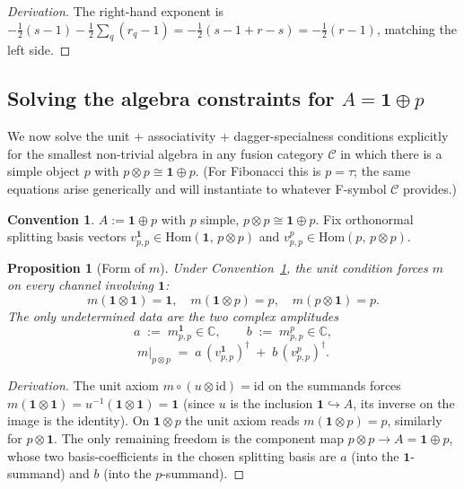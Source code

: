 \documentclass[11pt,a4paper]{article}
\newtheorem{proposition}[definition]{Proposition}
\theoremstyle{definition}
\newtheorem{convention}[definition]{Convention}
\newcommand{\Cc}{\mathcal{C}}
\newcommand{\Hom}{\mathrm{Hom}}
\newcommand{\id}{\mathrm{id}}
\newcommand{\one}{\mathbf{1}}
\begin{document}
\begin{proof}[Derivation]
The right-hand exponent is
$-\tfrac{1}{2}(s-1) - \tfrac{1}{2}\sum_q (r_q - 1)
= -\tfrac{1}{2}(s - 1 + r - s)
= -\tfrac{1}{2}(r - 1)$,
matching the left side. \end{proof}

\subsection{Solving the algebra constraints for $A = \one\oplus p$}\label{sec:alg-1p}

We now solve the unit + associativity + dagger-specialness conditions
explicitly for the smallest non-trivial algebra in any fusion category $\Cc$
in which there is a simple object $p$ with $p\otimes p \cong \one \oplus p$.
(For Fibonacci this is $p=\tau$; the same equations arise generically and
will instantiate to whatever F-symbol $\Cc$ provides.)

\begin{convention}\label{conv:1op}
$A := \one\oplus p$ with $p$ simple, $p\otimes p\cong\one\oplus p$. Fix
orthonormal splitting basis vectors
$v^{\one}_{p,p}\in\Hom(\one,\,p\otimes p)$ and
$v^{p}_{p,p}\in\Hom(p,\,p\otimes p)$.
\end{convention}

\begin{proposition}[Form of $m$]\label{prop:m-form}
Under Convention~\ref{conv:1op}, the unit condition forces $m$ on every
channel involving $\one$:
\[
m(\one\otimes\one) = \one,\quad
m(\one\otimes p) = p,\quad
m(p\otimes \one) = p.
\]
The only undetermined data are the two complex amplitudes
\[
a \;:=\; m^{\one}_{p,p}\in\mathbb{C}, \qquad b \;:=\; m^{p}_{p,p}\in\mathbb{C},
\]
\[
m\big|_{p\otimes p}
\;=\; a\,(v^{\one}_{p,p})^{\dagger} \;+\; b\,(v^{p}_{p,p})^{\dagger}.
\]
\end{proposition}

\begin{proof}[Derivation]
The unit axiom $m\circ(u\otimes\id) = \id$ on the summands forces
$m(\one\otimes\one) = u^{-1}(\one\otimes\one) = \one$ (since $u$ is the
inclusion $\one\hookrightarrow A$, its inverse on the image is the identity).
On $\one\otimes p$ the unit axiom reads $m(\one\otimes p) = p$, similarly for
$p\otimes\one$. The only remaining freedom is the component map
$p\otimes p \to A = \one\oplus p$, whose two basis-coefficients in the chosen
splitting basis are $a$ (into the $\one$-summand) and $b$ (into the
$p$-summand). \end{proof}
\end{document}
